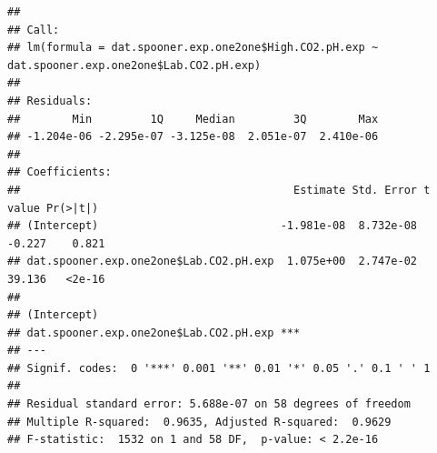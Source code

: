 \documentclass[]{article}
\newenvironment{Shaded}{\begin{snugshade}}{\end{snugshade}}
\newcommand{\DecValTok}[1]{\textcolor[rgb]{0.00,0.00,0.81}{#1}}
\newcommand{\KeywordTok}[1]{\textcolor[rgb]{0.13,0.29,0.53}{\textbf{#1}}}
\newcommand{\NormalTok}[1]{#1}
\newcommand{\OperatorTok}[1]{\textcolor[rgb]{0.81,0.36,0.00}{\textbf{#1}}}
\newcommand{\StringTok}[1]{\textcolor[rgb]{0.31,0.60,0.02}{#1}}
\begin{document}
\begin{Shaded}
\end{Shaded}

\begin{verbatim}
## 
## Call:
## lm(formula = dat.spooner.exp.one2one$High.CO2.pH.exp ~ dat.spooner.exp.one2one$Lab.CO2.pH.exp)
## 
## Residuals:
##        Min         1Q     Median         3Q        Max 
## -1.204e-06 -2.295e-07 -3.125e-08  2.051e-07  2.410e-06 
## 
## Coefficients:
##                                          Estimate Std. Error t value Pr(>|t|)
## (Intercept)                            -1.981e-08  8.732e-08  -0.227    0.821
## dat.spooner.exp.one2one$Lab.CO2.pH.exp  1.075e+00  2.747e-02  39.136   <2e-16
##                                           
## (Intercept)                               
## dat.spooner.exp.one2one$Lab.CO2.pH.exp ***
## ---
## Signif. codes:  0 '***' 0.001 '**' 0.01 '*' 0.05 '.' 0.1 ' ' 1
## 
## Residual standard error: 5.688e-07 on 58 degrees of freedom
## Multiple R-squared:  0.9635, Adjusted R-squared:  0.9629 
## F-statistic:  1532 on 1 and 58 DF,  p-value: < 2.2e-16
\end{verbatim}

\begin{Shaded}
\end{Shaded}
\end{document}
